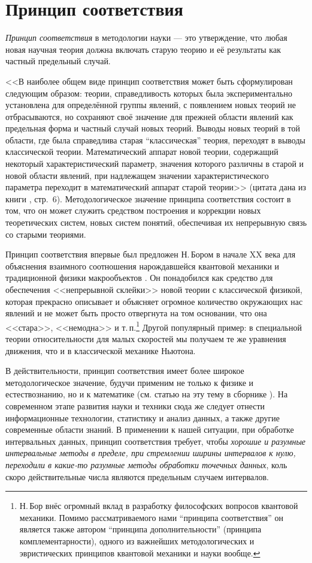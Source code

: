 \documentclass[a5paper,openany]{book}
\begin{document}
\section{Принцип соответствия} 
\label{CorresPrincpSect}
   
\textit{Принцип соответствия} в методологии науки --- это утверждение, что любая 
новая научная теория должна включать старую теорию и её результаты как частный 
предельный случай. 
  
<<В наиболее общем виде принцип соответствия может быть сформулирован следующим 
образом: теории, справедливость которых была экспериментально установлена для 
определённой группы явлений, с появлением новых теорий не отбрасываются, но сохраняют 
своё значение для прежней области явлений как предельная форма и частный случай новых 
теорий. Выводы новых теорий в той области, где была справедлива старая ``классическая'' 
теория, переходят в выводы классической теории. Математический аппарат новой теории, 
содержащий некоторый характеристический параметр, значения которого различны в старой 
и новой области явлений, при надлежащем значении характеристического параметра 
переходит в математический аппарат старой теории>> (цитата дана из книги 
\cite{CorrPrincBook}, стр.~6). Методологическое значение принципа соответствия 
состоит в том, что он может служить средством построения и коррекции новых 
теоретических систем, новых систем понятий, обеспечивая их непрерывную связь 
со старыми теориями. 
  
Принцип соответствия впервые был предложен Н.\,Бором в начале XX века для объяснения 
взаимного соотношения нарождавшейся квантовой механики и традиционной физики макрообъектов 
\cite{Bohr1928}. Он понадобился как средство для обеспечения <<непрерывной склейки>> новой 
теории с классической физикой, которая прекрасно описывает и объясняет огромное количество 
окружающих нас явлений и не может быть просто отвергнута на том основании, что она <<стара>>, 
<<немодна>> и т.\,п.\footnote{Н.\,Бор внёс огромный вклад в разработку философских вопросов 
квантовой механики. Помимо рассматриваемого нами ``принципа соответствия'' он является 
также автором ``принципа дополнительности'' (принципа комплементарности), одного 
из важнейших методологических и эвристических принципов квантовой механики и науки 
вообще.} Другой популярный пример: в специальной теории относительности для малых 
скоростей мы получаем те же уравнения движения, что и в классической механике Ньютона. 
  
В действительности, принцип соответствия имеет более широкое методологическое 
значение, будучи применим не только к физике и естествознанию, но и к математике 
(см. статью на эту тему в сборнике \cite{CorrPrincBook}). На современном этапе развития 
науки и техники сюда же следует отнести информационные технологии, статистику и анализ 
данных, а также другие современные области знаний. В применении к нашей ситуации, 
при обработке интервальных данных,  принцип соответствия требует, чтобы \emph{хорошие 
и разумные интервальные методы в пределе, при стремлении ширины интервалов к нулю, 
переходили в какие-то разумные методы обработки точечных данных}, коль скоро 
действительные числа являются предельным случаем интервалов. 
  
\end{document}
